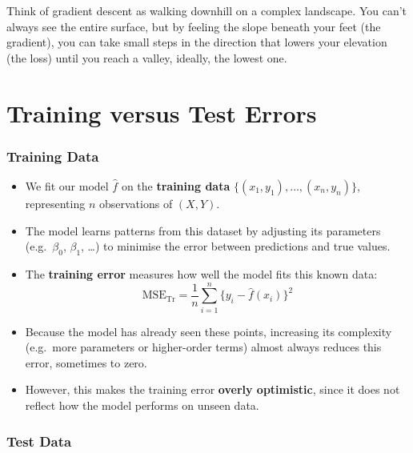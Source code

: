 \documentclass[
  letterpaper,
  DIV=11,
  numbers=noendperiod]{scrartcl}
\providecommand{\tightlist}{%
  \setlength{\itemsep}{0pt}\setlength{\parskip}{0pt}}\usepackage{longtable,booktabs,array}
\begin{document}
Think of gradient descent as walking downhill on a complex landscape.
You can't always see the entire surface, but by feeling the slope
beneath your feet (the gradient), you can take small steps in the
direction that lowers your elevation (the loss) until you reach a
valley, ideally, the lowest one.

\section{Training versus Test Errors}\label{training-versus-test-errors}

\subsubsection{Training Data}\label{training-data}

\begin{itemize}
\tightlist
\item
  We fit our model \(\hat{f}\) on the \textbf{training data}
  \(\{(x_1,y_1),\dots,(x_n,y_n)\}\), representing \(n\) observations of
  \((X,Y)\).
\item
  The model learns patterns from this dataset by adjusting its
  parameters (e.g.~\(\beta_0\), \(\beta_1\), \ldots) to minimise the
  error between predictions and true values.
\item
  The \textbf{training error} measures how well the model fits this
  known
  data:\[ \text{MSE}_{\text{Tr}} = \frac{1}{n}\sum_{i=1}^{n}\{y_i - \hat{f}(x_i)\}^2 \]
\item
  Because the model has already seen these points, increasing its
  complexity (e.g.~more parameters or higher-order terms) almost always
  reduces this error, sometimes to zero.
\item
  However, this makes the training error \textbf{overly optimistic},
  since it does not reflect how the model performs on unseen data.
\end{itemize}

\subsubsection{Test Data}\label{test-data}
\end{document}
